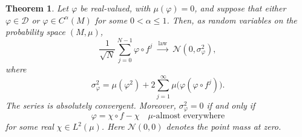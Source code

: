 \documentclass[10pt,a4paper]{amsart}
\newtheorem{theorem}{Theorem}[section]
\newcommand{\Dcal}{\mathcal D}
\numberwithin{equation}{section}
\begin{document}
\begin{theorem}\label{thm:CLT}
Let $\varphi$ be real-valued, with $\mu(\varphi)=0$, and suppose that either $\varphi\in\Dcal$ or $\varphi\in C^\alpha(M)$ for some $0<\alpha\le1$. Then, as random variables on the probability space $(M,\mu)$,
\begin{equation}\label{eq:CLT}
 \frac1{\sqrt N}\sum_{j=0}^{N-1}\varphi\circ f^j
 \ \xrightarrow{\ \mathrm{law}\ }\ \mathcal N(0,\sigma_\varphi^2),
\end{equation}
where
\begin{equation}\label{eq:variance}
 \sigma_\varphi^2=\mu(\varphi^2)
 +2\sum_{j=1}^{\infty}\mu\big(\varphi(\varphi\circ f^j)\big).
\end{equation}
The series is absolutely convergent. Moreover, $\sigma_\varphi^2=0$ if and only if
\[
 \varphi=\chi\circ f-\chi
 \quad\mu\text{-almost everywhere}
\]
for some real $\chi\in L^2(\mu)$. Here $\mathcal N(0,0)$ denotes the point mass at zero.
\end{theorem}
\end{document}
